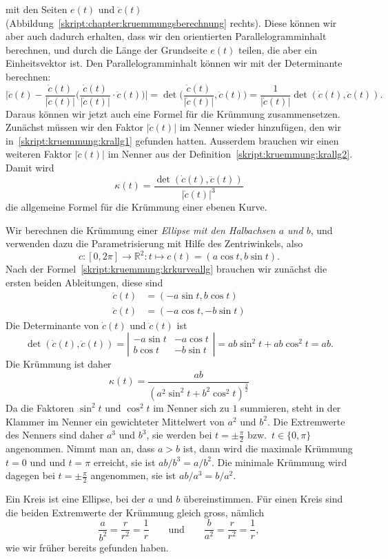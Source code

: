 mit den Seiten $e(t)$ und $\ddot c(t)$
(Abbildung~\ref{skript:chapter:kruemmungsberechnung} rechts).
Diese können wir aber auch dadurch erhalten, dass wir den orientierten
Parallelogramminhalt berechnen, und durch die Länge der Grundseite
$e(t)$ teilen, die aber ein Einheitsvektor ist.
Den Parallelogramminhalt können wir mit der Determinante berechnen:
\[
\biggl|\ddot c(t) - \frac{\dot c(t)}{|\dot c(t)|}
\biggl(\frac{\dot c(t)}{|\dot c(t)|} \cdot \ddot c(t)\biggr)\biggr|
=
\det \biggl(\frac{\dot c(t)}{|\dot c(t)|}, \ddot c(t)\biggr)
=
\frac1{|\dot c(t)|}\det (\dot c(t),\ddot c(t)).
\]
Daraus können wir jetzt auch eine Formel für die Krümmung zusammensetzen.
Zunächst müssen wir den Faktor $|\dot c(t)|$ im Nenner wieder
hinzufügen, den wir in~\eqref{skript:kruemmung:krallg1} gefunden hatten.
Ausserdem brauchen wir einen weiteren Faktor $|\dot c(t)|$ im Nenner
aus der Definition~\eqref{skript:kruemmung:krallg2}.
Damit wird
\begin{equation}
\kappa(t)
=
\frac{\det(\dot c(t),\ddot c(t))}{|\dot c(t)|^3}
\label{skript:kruemmung:krkurveallg}
\end{equation}
die allgemeine Formel für die Krümmung einer ebenen Kurve.


\begin{beispiel}
Wir berechnen die Krümmung einer {\em Ellipse mit den Halbachsen
$a$ und $b$}, und verwenden dazu die Parametrisierung mit Hilfe des
Zentriwinkels, also
\[
c
\colon
[0,2\pi]\to\mathbb R^2
\colon
t\mapsto c(t) = (a\cos t, b \sin t).
\]
Nach der Formel~\eqref{skript:kruemmung:krkurveallg} brauchen wir zunächst
die ersten beiden Ableitungen, diese sind
\begin{align*}
\dot c(t)
&=
(-a\sin t, b\cos t)
\\
\ddot c(t)
&=
(-a\cos t, -b\sin t)
\end{align*}
Die Determinante von $\dot c(t)$ und $\ddot c(t)$ ist
\[
\det(\dot c(t), \ddot c(t))
=
\left|\begin{matrix}
-a\sin t & -a \cos t\\
 b\cos t & -b \sin t
\end{matrix}\right|
=
ab\sin^2t+ab\cos^2 t
=
ab.
\]
Die Krümmung ist daher
\[
\kappa(t)
=
\frac{ab}{(a^2\sin^2 t + b^2 \cos^2 t)^{\frac32}}
\]
Da die Faktoren $\sin^2t$ und $\cos^2t$ im Nenner sich zu $1$ summieren,
steht in der Klammer im Nenner ein gewichteter Mittelwert von $a^2$
und $b^2$.
Die Extremwerte des Nenners sind daher $a^3$ und $b^3$, sie werden bei
$t=\pm\frac{\pi}2$ bzw.~$t\in\{0,\pi\}$ angenommen.
Nimmt man an, dass $a>b$ ist, dann wird die maximale Krümmung $t=0$ und
und $t=\pi$ erreicht, sie ist $ab/b^3=a/b^2$.
Die minimale Krümmung wird dagegen bei $t=\pm\frac{\pi}2$ angenommen,
sie ist $ab/a^3=b/a^2$.

Ein Kreis ist eine Ellipse, bei der $a$ und $b$ übereinstimmen.
Für einen Kreis sind die beiden Extremwerte der Krümmung
gleich gross, nämlich
\[
\frac{a}{b^2}=\frac{r}{r^2}=\frac1r
\qquad\text{und}\qquad
\frac{b}{a^2}=\frac{r}{r^2}=\frac1r,
\]
wie wir früher bereits gefunden haben.
\end{beispiel}

